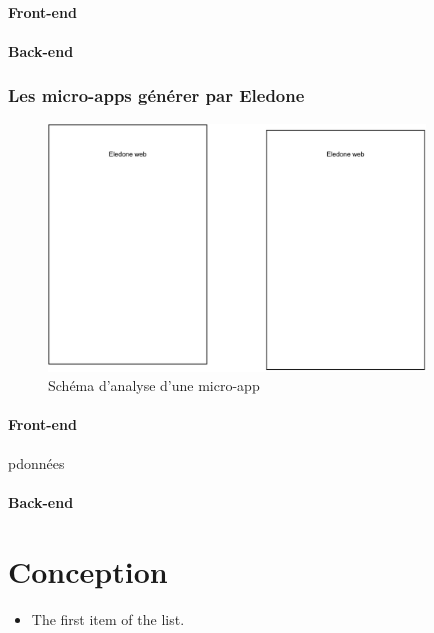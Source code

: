 \documentclass{rapport_stage}
\begin{document}
\subsection*{Front-end}

\subsection*{Back-end}

\section{Les micro-apps générer par Eledone}

\begin{figure}[ht]
  \centering
  \includegraphics[width=10cm]{figures/eledone.pdf}
  \caption{Schéma d'analyse d'une micro-app}
  \label{fig:analyse-micro-app}
\end{figure}

\subsection*{Front-end}

\gls{pdonnées}

\subsection*{Back-end}




\part{Conception}

\begin{itemize}[label=$\bullet$]
  \item The first item of the list.
\end{itemize}
\end{document}
